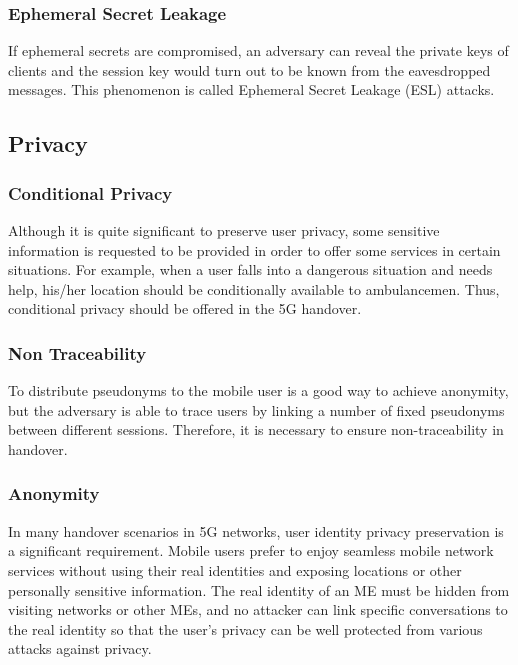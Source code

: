 {{        \subsubsection{Ephemeral Secret Leakage}{
            If ephemeral secrets are compromised, an adversary can reveal the private keys of clients and the session key would turn out to be known from the eavesdropped messages. This phenomenon is called Ephemeral Secret Leakage (ESL) attacks.
        }
        
    }
    \subsection{Privacy}{
        \subsubsection{Conditional Privacy}{
            Although it is quite significant
            to preserve user privacy, some sensitive information is requested
            to be provided in order to offer some services in
            certain situations. For example, when a user falls into a
            dangerous situation and needs help, his/her location should
            be conditionally available to ambulancemen. Thus, conditional
            privacy should be offered in the 5G handover.
        }
        \subsubsection{Non Traceability}{
            To distribute pseudonyms to the
            mobile user is a good way to achieve anonymity, but the
            adversary is able to trace users by linking a number of
            fixed pseudonyms between different sessions. Therefore, it is
            necessary to ensure non-traceability in handover.
        }
        \subsubsection{Anonymity}{
            In many handover
            scenarios in 5G networks, user identity privacy preservation
            is a significant requirement. Mobile users prefer to enjoy
            seamless mobile network services without using their real
            identities and exposing locations or other personally sensitive
            information. The real identity of an ME must be hidden from
            visiting networks or other MEs, and no attacker can link
            specific conversations to the real identity so that the user’s
            privacy can be well protected from various attacks against
            privacy.
        }
    }

}

